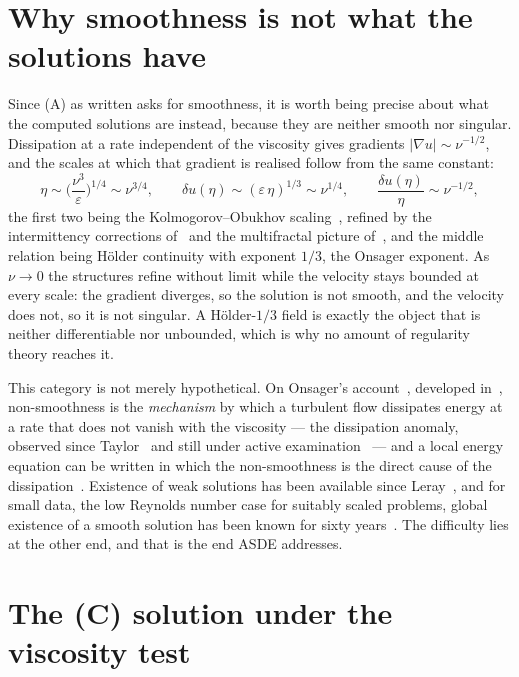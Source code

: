 \documentclass[11pt]{article}
\newcommand{\grad}{\nabla}
\newcommand{\eps}{\varepsilon}
\begin{document}
\section{Why smoothness is not what the solutions have}\label{sec:third}

Since (A) as written asks for smoothness, it is worth being precise about what the computed
solutions are instead, because they are neither smooth nor singular. Dissipation at a rate
independent of the viscosity gives gradients $|\grad u|\sim\nu^{-1/2}$, and the scales at which
that gradient is realised follow from the same constant:
\begin{equation}\label{eq:delta}
\eta \sim \Big(\frac{\nu^3}{\eps}\Big)^{1/4} \sim \nu^{3/4},
\qquad
\delta u(\eta) \sim (\eps\,\eta)^{1/3} \sim \nu^{1/4},
\qquad
\frac{\delta u(\eta)}{\eta} \sim \nu^{-1/2},
\end{equation}
the first two being the Kolmogorov--Obukhov scaling~\cite{kolmogorov41,obukhov41}, refined by the
intermittency corrections of~\cite{kolmogorov62,obukhov62} and the multifractal picture
of~\cite{frischparisi}, and the middle relation being H\"older continuity with exponent $1/3$, the
Onsager exponent. As $\nu\to0$ the structures refine without limit while the velocity stays bounded
at every scale: the gradient diverges, so the solution is not smooth, and the velocity does not, so
it is not singular. A H\"older-$1/3$ field is exactly the object that is neither differentiable nor
unbounded, which is why no amount of regularity theory reaches it.

This category is not merely hypothetical. On Onsager's account~\cite{onsager}, developed
in~\cite{eyink,dls,bdlis}, non-smoothness is the \emph{mechanism} by which a
turbulent flow dissipates energy at a rate that does not vanish with the viscosity --- the
dissipation anomaly, observed since Taylor~\cite{taylor} and still under active
examination~\cite{iyer} --- and a local energy equation can be written in which the non-smoothness
is the direct cause of the dissipation~\cite{duchonrobert}. Existence of weak solutions has been
available since Leray~\cite{leray,lions}, and for small data, the low Reynolds number case for
suitably scaled problems, global existence of a smooth solution has been known for sixty
years~\cite{fujitakato,kato}. The difficulty lies at the other end, and that is the end ASDE
addresses.


\section{The (C) solution under the viscosity test}\label{sec:nu}
\end{document}
